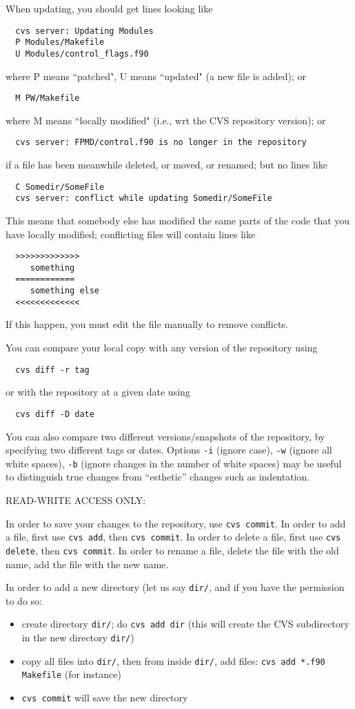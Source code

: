 \documentclass[12pt,a4paper]{article}
\begin{document}
When updating, you should get lines looking like
\begin{verbatim}
  cvs server: Updating Modules
  P Modules/Makefile
  U Modules/control_flags.f90
\end{verbatim}
where P means ``patched", U means ``updated" (a new file is added); or
\begin{verbatim}
  M PW/Makefile
\end{verbatim}
where M means ``locally modified" (i.e., wrt the CVS repository
version); or
\begin{verbatim}
  cvs server: FPMD/control.f90 is no longer in the repository
\end{verbatim}
if a file has been meanwhile deleted, or moved, or renamed; but no lines like
\begin{verbatim}
  C Somedir/SomeFile
  cvs server: conflict while updating Somedir/SomeFile
\end{verbatim}
This means that somebody else has modified the same parts of the code 
that you have locally modified; conflicting files will contain lines like
\begin{verbatim}
  >>>>>>>>>>>>>
     something
  ============
     something else
  <<<<<<<<<<<<<
\end{verbatim}
If this happen, you must edit the file manually to remove conflicts.

You can compare your local copy with any version of the repository
using 
\begin{verbatim}
  cvs diff -r tag
\end{verbatim}
or with the repository at a given date using 
\begin{verbatim}
  cvs diff -D date
\end{verbatim}
You can also compare two different versions/snapshots of the repository, 
by specifying two different tags or dates. Options \texttt{-i} (ignore case),  
\texttt{-w} (ignore all white spaces), \texttt{-b} (ignore changes in 
the number of white spaces) may be useful to distinguish true changes
from ``esthetic'' changes such as indentation.

READ-WRITE ACCESS ONLY:

In order to save your changes to the repository, use
{\tt cvs commit}. In order to add a file, first use
{\tt cvs add}, then {\tt cvs commit}. In order to delete
a file, first use {\tt cvs delete}, then {\tt cvs commit}.
In order to rename a file, delete the file with the old
name, add the file with the new name.

In order to add a new directory (let us say {\tt dir/}, 
and if you have the permission to do so:
\begin{itemize}
\item create directory {\tt dir/}; do {\tt cvs add dir} (this
will create the CVS subdirectory in the new directory {\tt dir/})
\item 
copy all files into {\tt dir/}, then from inside {\tt dir/}, add files:
{\tt cvs add *.f90 Makefile} (for instance)
\item
{\tt cvs commit} will save the new directory
\end{itemize}
\end{document}
